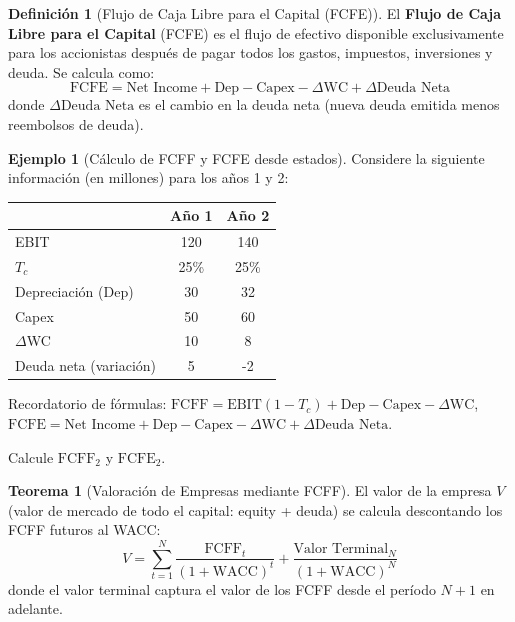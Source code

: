 \documentclass[12pt,a4paper]{article}
\theoremstyle{definition}
\newtheorem{definicion}{Definición}[section]
\newtheorem{teorema}{Teorema}[section]
\newtheorem{ejemplo}{Ejemplo}[section]
\begin{document}
\begin{definicion}[Flujo de Caja Libre para el Capital (FCFE)]
El \textbf{Flujo de Caja Libre para el Capital} (FCFE) es el flujo de efectivo disponible exclusivamente para los accionistas después de pagar todos los gastos, impuestos, inversiones y deuda. Se calcula como:
\begin{equation}
\text{FCFE} = \text{Net Income} + \text{Dep} - \text{Capex} - \Delta \text{WC} + \Delta \text{Deuda Neta}
\end{equation}
donde $\Delta \text{Deuda Neta}$ es el cambio en la deuda neta (nueva deuda emitida menos reembolsos de deuda).
\end{definicion}

\begin{ejemplo}[Cálculo de FCFF y FCFE desde estados]
Considere la siguiente información (en millones) para los años 1 y 2:

\begin{center}
\begin{tabular}{lcc}
\toprule
 & Año 1 & Año 2 \\
\midrule
EBIT & 120 & 140 \\
$T_c$ & 25\% & 25\% \\
Depreciación (Dep) & 30 & 32 \\
Capex & 50 & 60 \\
$\Delta$WC & 10 & 8 \\
Deuda neta (variación) & 5 & -2 \\
\bottomrule
\end{tabular}
\end{center}

Recordatorio de fórmulas: $\text{FCFF} = \text{EBIT}(1 - T_c) + \text{Dep} - \text{Capex} - \Delta \text{WC}$,\; $\text{FCFE} = \text{Net~Income} + \text{Dep} - \text{Capex} - \Delta \text{WC} + \Delta \text{Deuda Neta}$.

Calcule $\text{FCFF}_2$ y $\text{FCFE}_2$.
\end{ejemplo}

\begin{teorema}[Valoración de Empresas mediante FCFF]
El valor de la empresa $V$ (valor de mercado de todo el capital: equity + deuda) se calcula descontando los FCFF futuros al WACC:
\begin{equation}
V = \sum_{t=1}^{N} \frac{\text{FCFF}_t}{(1 + \text{WACC})^t} + \frac{\text{Valor Terminal}_N}{(1 + \text{WACC})^N}
\end{equation}
donde el valor terminal captura el valor de los FCFF desde el período $N+1$ en adelante.
\end{teorema}
\end{document}
